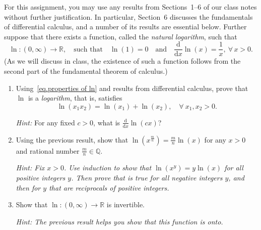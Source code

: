 \documentclass[12 pt,letterpaper]{article}
\newcommand{\bbQ}{\mathbb{Q}}
\newcommand{\bbR}{\mathbb{R}}
\newcommand{\rmd}{\mathrm{d}}
\begin{document}
\noindent
For this assignment,
you may use any results from Sections~1--6 of our class notes without further justification.
In particular, Section~6 discusses the fundamentals of differential calculus,
and a number of its results are essential below.
Further suppose that there exists a function, called the \textit{natural logarithm}, such that
\begin{equation}
\label{eq.properties of ln}
\ln:(0,\infty)\rightarrow\bbR,
\quad\text{such that}\quad
\ln(1)=0
\quad\text{and}\quad
\frac{\rmd}{\rmd x}\ln(x)=\frac1x,\ \forall\,x>0.
\end{equation}
(As we will discuss in class,
the existence of such a function follows from the second part of the fundamental theorem of calculus.)

\begin{enumerate}
\item
Using~\eqref{eq.properties of ln} and results from differential calculus,
prove that $\ln$ is a \textit{logarithm}, that is, satisfies
\begin{equation*}
\ln(x_1x_2)=\ln(x_1)+\ln(x_2),\quad \forall\ x_1,x_2>0.
\end{equation*}

\textit{Hint:} For any fixed $c>0$, what is $\displaystyle\frac{\rmd}{\rmd x}\ln(cx)$?

\item
Using the previous result, show that $\ln(x^{\frac mn})=\frac mn\ln(x)$ for any $x>0$ and rational number $\frac mn\in\bbQ$.

\textit{Hint: Fix $x>0$.
Use induction to show that $\ln(x^y)=y\ln(x)$ for all positive integers $y$.
Then prove that is true for all negative integers $y$, and then for $y$ that are reciprocals of positive integers.}

\item
Show that $\ln:(0,\infty)\rightarrow\bbR$ is invertible.

\textit{Hint: The previous result helps you show that this function is onto.}

\end{enumerate}
\end{document}
